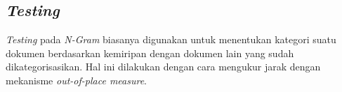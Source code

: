 \documentclass[../Proposal.tex]{subfiles}
\begin{document}
		\subsection{\textit{Testing}}
		\textit{Testing} pada \textit{N-Gram} biasanya digunakan untuk menentukan kategori suatu dokumen berdasarkan kemiripan dengan dokumen lain yang sudah dikategorisasikan. Hal ini dilakukan dengan cara mengukur jarak dengan mekanisme \textit{out-of-place measure}\cite{ngram-java}. 
\end{document}
